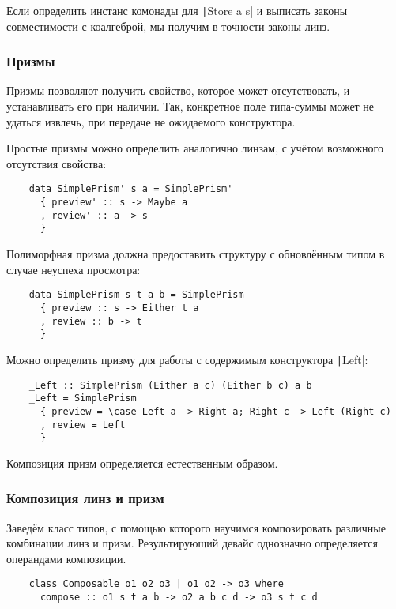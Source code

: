 Если определить инстанс комонады для \texttt|Store a s| и выписать законы совместимости с коалгеброй, мы получим в точности законы линз.

\subsubsection{Призмы}

Призмы позволяют получить свойство, которое может отсутствовать, и устанавливать его при наличии.
Так, конкретное поле типа-суммы может не удаться извлечь, при передаче не ожидаемого конструктора.

Простые призмы можно определить аналогично линзам, с учётом возможного отсутствия свойства:

\begin{verbatim}
    data SimplePrism' s a = SimplePrism'
      { preview' :: s -> Maybe a
      , review' :: a -> s
      }
\end{verbatim}

Полиморфная призма должна предоставить структуру с обновлённым типом в случае неуспеха просмотра:
\begin{verbatim}
    data SimplePrism s t a b = SimplePrism
      { preview :: s -> Either t a
      , review :: b -> t
      }
\end{verbatim}

Можно определить призму для работы с содержимым конструктора \texttt|Left|:
\begin{verbatim}
    _Left :: SimplePrism (Either a c) (Either b c) a b
    _Left = SimplePrism
      { preview = \case Left a -> Right a; Right c -> Left (Right c)
      , review = Left
      }
\end{verbatim}

Композиция призм определяется естественным образом.


\subsubsection{Композиция линз и призм}

Заведём класс типов, с помощью которого научимся композировать различные комбинации линз и призм.
Результирующий девайс однозначно определяется операндами композиции.

\begin{verbatim}
    class Composable o1 o2 o3 | o1 o2 -> o3 where
      compose :: o1 s t a b -> o2 a b c d -> o3 s t c d
\end{verbatim}

